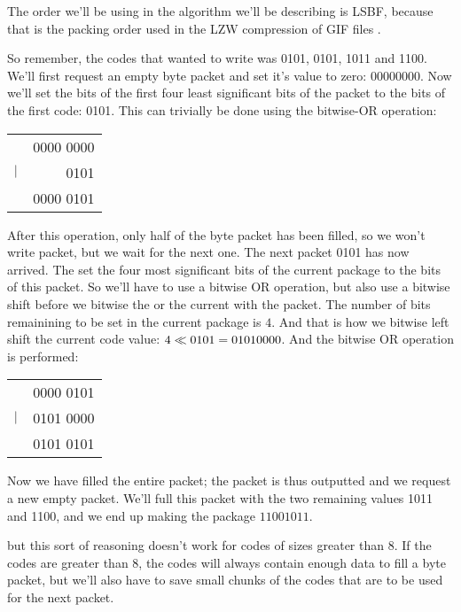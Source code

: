 \begin{refsection}
The order we'll be using in the algorithm we'll be describing is LSBF,
because that is the packing order used in the LZW compression of GIF
files \cite{gif89a}.

So remember, the codes that wanted to write was 0101, 0101, 1011 and
1100. We'll first request an empty byte packet and set it's value to
zero: $0000 0000$. Now we'll set the bits of the first four least
significant bits of the packet to the bits of the first code:
0101. This can trivially be done using the bitwise-OR operation:

\begin{center}
  \begin{tabular}{lr}
    & 0000 0000  \\
    $\mathrel{|}$ & 0101 \\
    \hline
    & 0000 0101 \\
  \end{tabular}
\end{center}

After this operation, only half of the byte packet has been filled, so
we won't write packet, but we wait for the next one. The next packet
0101 has now arrived. The set the four most significant bits of the
current package to the bits of this packet. So we'll have to use a
bitwise OR operation, but also use a bitwise shift before we bitwise
the or the current with the packet. The number of bits remainining to
be set in the current package is $4$. And that is how we bitwise left
shift the current code value: $4 \ll 0101 = 0101 0000$. And
the bitwise OR operation is performed:

\begin{center}
  \begin{tabular}{lr}
    & 0000 0101  \\
    $\mathrel{|}$ & 0101 0000 \\
    \hline
    & 0101 0101 \\
  \end{tabular}
\end{center}

Now we have filled the entire packet; the packet is thus outputted and
we request a new empty packet. We'll full this packet with the two
remaining values 1011 and 1100, and we end up making the package $1100
1011$.

but this sort of reasoning doesn't work for codes of sizes greater
than $8$. If the codes are greater than $8$, the codes will always
contain enough data to fill a byte packet, but we'll also have to save
small chunks of the codes that are to be used for the next packet.


\end{refsection}
